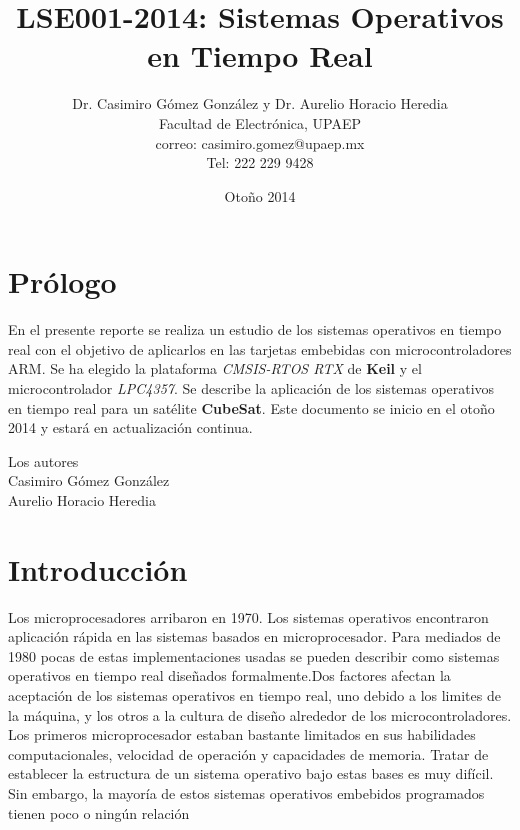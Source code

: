 \documentclass[12pt, twoside]{report}
\title{LSE001-2014: Sistemas Operativos en Tiempo Real}
\author{Dr. Casimiro Gómez González y Dr. Aurelio Horacio Heredia\\
	Facultad de Electrónica, UPAEP\\
               correo: casimiro.gomez@upaep.mx\\
               Tel: 222 229 9428}
\date{Otoño 2014}
\begin{document}
\maketitle

\chapter*{Prólogo}

En el presente reporte se realiza un estudio de los sistemas operativos en tiempo real con el objetivo de aplicarlos en las tarjetas embebidas con microcontroladores ARM. Se ha elegido la plataforma \textit{CMSIS-RTOS RTX} de \textbf{Keil} y el microcontrolador \textit{LPC4357}. Se describe la aplicación de los sistemas operativos en tiempo real para un satélite \textbf{CubeSat}. Este documento se inicio en el otoño 2014 y estará en actualización continua.


\begin{flushright}
	
	Los autores\\
	Casimiro Gómez González\\
	Aurelio Horacio Heredia
\end{flushright}

\tableofcontents


\chapter{Introducción}

Los microprocesadores arribaron en 1970. Los sistemas operativos encontraron aplicación rápida en las sistemas basados en microprocesador. Para mediados de 1980 pocas de estas implementaciones usadas se pueden describir como sistemas operativos en tiempo real diseñados formalmente.Dos factores afectan la aceptación de los sistemas operativos en tiempo real, uno debido a los limites de la máquina, y los otros a la cultura de diseño alrededor de los microcontroladores. Los primeros microprocesador estaban bastante limitados en sus habilidades computacionales, velocidad de operación y capacidades de memoria. Tratar de establecer la estructura de un sistema operativo bajo estas bases es muy difícil. Sin embargo, la mayoría de estos sistemas operativos embebidos programados tienen poco o ningún relación 



\end{document}
